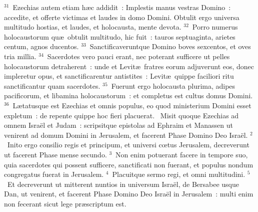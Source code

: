 ${}^{31}$~Ezechias autem etiam h\ae c addidit~: Implestis manus vestras Domino~: accedite, et offerte victimas et laudes in domo Domini. Obtulit ergo universa multitudo hostias, et laudes, et holocausta, mente devota.
${}^{32}$~Porro numerus holocaustorum qu\ae\ obtulit multitudo, hic fuit~: tauros septuaginta, arietes centum, agnos ducentos.
${}^{33}$~Sanctificaveruntque Domino boves sexcentos, et oves tria millia.
${}^{34}$~Sacerdotes vero pauci erant, nec poterant sufficere ut pelles holocaustorum detraherent~: unde et Levit\ae\ fratres eorum adjuverunt eos, donec impleretur opus, et sanctificarentur antistites~: Levit\ae\ quippe faciliori ritu sanctificantur quam sacerdotes.
${}^{35}$~Fuerunt ergo holocausta plurima, adipes pacificorum, et libamina holocaustorum~: et completus est cultus domus Domini.
${}^{36}$~L\ae tatusque est Ezechias et omnis populus, eo quod ministerium Domini esset expletum~: de repente quippe hoc fieri placuerat.
~Misit quoque Ezechias ad omnem Isra\"el et Judam~: scripsitque epistolas ad Ephraim et Manassen ut venirent ad domum Domini in Jerusalem, et facerent Phase Domino Deo Isra\"el.
${}^{2}$~Inito ergo consilio regis et principum, et universi cœtus Jerusalem, decreverunt ut facerent Phase mense secundo.
${}^{3}$~Non enim potuerant facere in tempore suo, quia sacerdotes qui possent sufficere, sanctificati non fuerant, et populus nondum congregatus fuerat in Jerusalem.
${}^{4}$~Placuitque sermo regi, et omni multitudini.
${}^{5}$~Et decreverunt ut mitterent nuntios in universum Isra\"el, de Bersabee usque Dan, ut venirent, et facerent Phase Domino Deo Isra\"el in Jerusalem~: multi enim non fecerant sicut lege pr\ae scriptum est.


